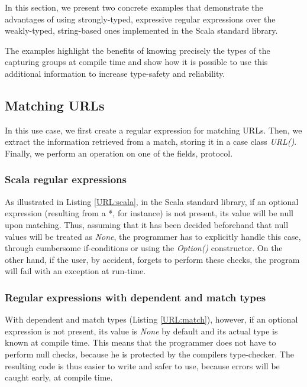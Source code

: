In this section, we present two concrete examples that demonstrate the advantages of using strongly-typed, expressive regular expressions over the weakly-typed, string-based ones implemented in the Scala standard library.

The examples highlight the benefits of knowing precisely the types of the capturing groups at compile time and show how it is possible to use this additional information to increase type-safety and reliability.

\subsection{Matching URLs}

In this use case, we first create a regular expression for matching URLs. Then, we extract the information retrieved from a match, storing it in a case class \textit{URL()}. Finally, we perform an operation on one of the fields, protocol.

\subsubsection{Scala regular expressions}

As illustrated in Listing \ref{URL:scala}, in the Scala standard library, if an optional expression (resulting from a *, for instance) is not present, its value will be null upon matching. Thus, assuming that it has been decided beforehand that null values will be treated as \textit{None}, the programmer has to explicitly handle this case, through cumbersome if-conditions or using the \textit{Option()} constructor. On the other hand, if the user, by accident, forgets to perform these checks, the program will fail with an exception at run-time. 

\subsubsection{Regular expressions with dependent and match types}

With dependent and match types (Listing \ref{URL:match}), however, if an optional expression is not present, its value is \textit{None} by default and its actual type is known at compile time. This means that the programmer does not have to perform null checks, because he is protected by the compiler\textquotesingle s type-checker. The resulting code is thus easier to write and safer to use, because errors will be caught early, at compile time.

